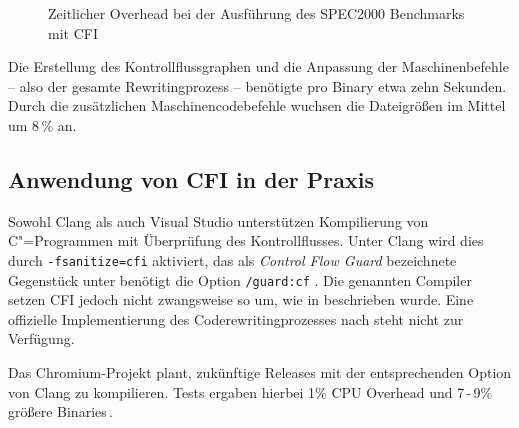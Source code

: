 \documentclass[12pt,%
               oneside,
               a4paper]{uiothesis}
\begin{document}
\begin{figure}
  \centering
  \caption{Zeitlicher Overhead bei der Ausführung des SPEC2000 Benchmarks mit CFI}
  \label{img:time.overhead}
\end{figure}

Die Erstellung des Kontrollflussgraphen und die Anpassung der Maschinenbefehle -- also der gesamte Rewritingprozess -- benötigte pro Binary etwa zehn Sekunden. Durch die zusätzlichen Maschinencodebefehle wuchsen die Dateigrößen im Mittel um 8\,\% an.


\subsection{Anwendung von CFI in der Praxis}
Sowohl Clang als auch Visual Studio unterstützen Kompilierung von C"=Programmen mit Überprüfung des Kontrollflusses. Unter Clang wird dies durch \texttt{-fsanitize=cfi} aktiviert, das als \emph{Control Flow Guard} bezeichnete Gegenstück unter benötigt die Option \texttt{/guard:cf} \cite{ClangTeam.2015,Microsoft.2016}. Die genannten Compiler setzen CFI jedoch nicht zwangsweise so um, wie in \cite{Abadi.2009} beschrieben wurde. Eine offizielle Implementierung des Coderewritingprozesses nach \cite{Abadi.2009} steht nicht zur Verfügung.

Das Chromium-Projekt plant, zukünftige Releases mit der entsprechenden Option von Clang zu kompilieren. Tests ergaben hierbei 1\% CPU Overhead und 7\,-\,9\% größere Binaries\,\cite{ChromiumProjects.}.
\end{document}
